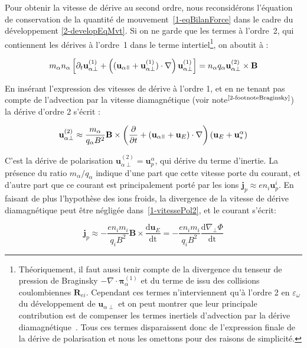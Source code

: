 \begin{refsection}
Pour obtenir la vitesse de dérive au second ordre, nous reconsidérons
l'équation de conservation de la quantité de mouvement~\eqref{1-eqBilanForce}
dans le cadre du développement \eqref{2-developEqMvt}. Si on
ne garde que les termes à l'ordre~2, qui contiennent les dérives à l'ordre~1
dans le terme intertiel\footnote{\label{2-footnoteBraginsky}Théoriquement, il faut aussi
tenir compte de la divergence du tenseur de pression de Braginsky
$-\nabla\cdot\boldsymbol{\pi}^{(1)}_\alpha$ et du terme de issu des collisions
coulombiennes $\mathbf R_{ei}$. Cependant ces termes
n'interviennent qu'à l'ordre 2 en
$\varepsilon_\omega$ du développement de $\mathbf u_{\alpha\perp}$ et on peut
montrer que leur principale contribution est de compenser les termes inertiels
d'advection par la dérive diamagnétique~\parencite{Tamain2}. Tous ces termes
disparaissent donc de l'expression finale de la dérive de polarisation et
nous les omettons pour des raisons de simplicité.}, on aboutit à :

\begin{equation}
m_\alpha n_\alpha\left[\partial_t \mathbf{u}^{(1)}_{\alpha\perp} +
\left((\mathbf{u}_{\alpha\para}+\mathbf
u^{(1)}_{\alpha\perp})\cdot\nabla\right)\mathbf{u}^{(1)}_{\alpha\perp}\right]
=n_\alpha q_\alpha\mathbf u^{(2)}_{\alpha\perp}\times \mathbf
B
\end{equation}

En insérant l'expression des vitesses de dérive à l'ordre 1, et en ne tenant pas
compte de l'advection par la vitesse diamagnétique (voir
note$^\text{\ref{2-footnoteBraginsky}}$) la dérive d'ordre 2 s'écrit :

\begin{equation}
\label{1-vitessePol2}
\mathbf{u}_{\alpha\perp}^{(2)}\approx\frac{m_\alpha}{q_\alpha
B^2}\mathbf
B\times\left(\frac{\partial}{\partial{t}}+(\mathbf
u_{\alpha\para}+\mathbf u_{E})\cdot\nabla\right)(\mathbf u_E +
\mathbf u^\alpha_*)
\end{equation}

C'est la dérive de polarisation $\mathbf{u}_{\alpha\perp}^{(2)}=\mathbf
u^\alpha_p$, qui dérive du terme d'inertie. 
La présence du ratio $m_\alpha/q_\alpha$ indique
d'une part que cette vitesse porte du courant, et d'autre part que ce
courant est principalement porté par les ions $\mathbf{j}_p\approx en_i\mathbf
u^i_p$. En faisant de plus l'hypothèse des ions froids, la divergence de la vitesse de dérive diamagnétique peut être
négligée dans~\eqref{1-vitessePol2}, et le courant s'écrit:

\begin{equation}
\label{1-courantPol}
\mathbf{j}_p \approx-\frac{en_im_i}{q_i
B^2}\mathbf B\times\frac{\text{d}\mathbf u_E}{\text{dt}}=
-\frac{en_im_i}{q_i B^2}\frac{\text{d}\nabla_\perp \Phi}{\text{dt}}
\end{equation}


\end{refsection}
